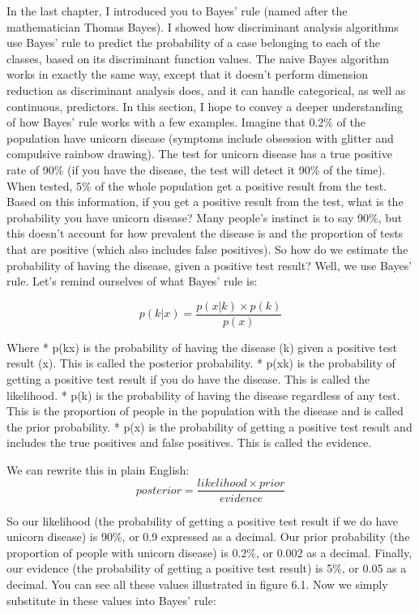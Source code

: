 \documentclass[
]{article}
\begin{document}
In the last chapter, I introduced you to Bayes' rule (named after the
mathematician Thomas Bayes). I showed how discriminant analysis
algorithms use Bayes' rule to predict the probability of a case
belonging to each of the classes, based on its discriminant function
values. The naive Bayes algorithm works in exactly the same way, except
that it doesn't perform dimension reduction as discriminant analysis
does, and it can handle categorical, as well as continuous, predictors.
In this section, I hope to convey a deeper understanding of how Bayes'
rule works with a few examples. Imagine that 0.2\% of the population
have unicorn disease (symptoms include obsession with glitter and
compulsive rainbow drawing). The test for unicorn disease has a true
positive rate of 90\% (if you have the disease, the test will detect it
90\% of the time). When tested, 5\% of the whole population get a
positive result from the test. Based on this information, if you get a
positive result from the test, what is the probability you have unicorn
disease? Many people's instinct is to say 90\%, but this doesn't account
for how prevalent the disease is and the proportion of tests that are
positive (which also includes false positives). So how do we estimate
the probability of having the disease, given a positive test result?
Well, we use Bayes' rule. Let's remind ourselves of what Bayes' rule is:

\[
p(k|x) = \frac{p(x|k) \times p(k)}{p(x)}
\]

Where * p(k\textbar x) is the probability of having the disease (k)
given a positive test result (x). This is called the posterior
probability. * p(x\textbar k) is the probability of getting a positive
test result if you do have the disease. This is called the likelihood. *
p(k) is the probability of having the disease regardless of any test.
This is the proportion of people in the population with the disease and
is called the prior probability. * p(x) is the probability of getting a
positive test result and includes the true positives and false
positives. This is called the evidence.

We can rewrite this in plain English: \[
posterior = \frac{likelihood \times prior}{evidence}
\]

So our likelihood (the probability of getting a positive test result if
we do have unicorn disease) is 90\%, or 0.9 expressed as a decimal. Our
prior probability (the proportion of people with unicorn disease) is
0.2\%, or 0.002 as a decimal. Finally, our evidence (the probability of
getting a positive test result) is 5\%, or 0.05 as a decimal. You can
see all these values illustrated in figure 6.1. Now we simply substitute
in these values into Bayes' rule:
\end{document}
